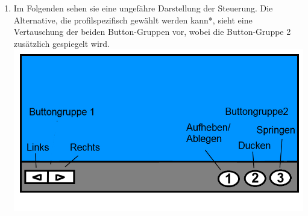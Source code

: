\documentclass{scrartcl}
\begin{document}
\begin{enumerate}
	\item Im Folgenden sehen sie eine ungefähre Darstellung der Steuerung. Die Alternative, die profilspezifisch gewählt werden kann*, sieht eine Vertauschung der beiden Button-Gruppen vor, wobei die Button-Gruppe 2 zusätzlich gespiegelt wird.\\
	\includegraphics[scale=0.5]{assets/Steuerung}
\end{enumerate}
\end{document}

